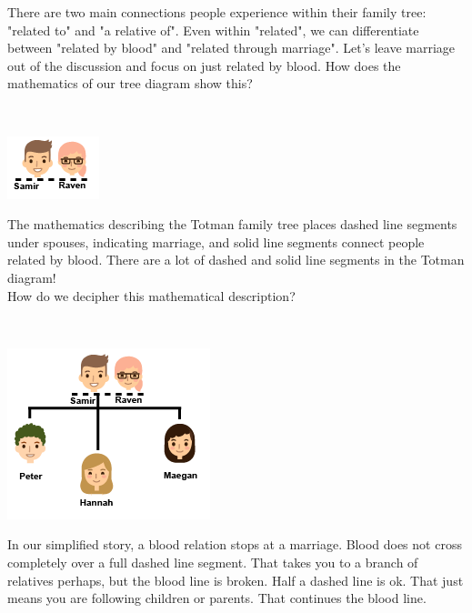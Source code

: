 \documentclass{ximera}
\begin{document}
There are two main connections people experience within their family tree: "related to" and "a relative of". Even within "related", we can differentiate between "related by blood" and "related through marriage". Let's leave marriage out of the discussion and focus on just related by blood.  How does the mathematics of our tree diagram show this?



\begin{notation}
\quad \\

\begin{center}
\includegraphics{pics/Samir_Raven.png}
\end{center}



The mathematics describing the Totman family tree places dashed line segments under spouses, indicating marriage, and solid line segments connect people related by blood. There are a lot of dashed and solid line segments in the Totman diagram!  \\

How do we decipher this mathematical description?

\end{notation}





\begin{notation}
\quad \\


\begin{center}
\includegraphics{pics/Samir_Raven_children.png}
\end{center}


In our simplified story, a blood relation stops at a marriage.  Blood does not cross completely over a full dashed line segment. That takes you to a branch of relatives perhaps, but the blood line is broken.  Half a dashed line is ok.  That just means you are following children or parents.  That continues the blood line.

\end{notation}
\end{document}
